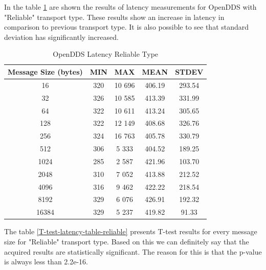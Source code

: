 \documentclass{csfourzero}
\begin{document}
In the table \ref{openDDS-latency-table-reliable} are shown the results of latency measurements for OpenDDS with "Reliable" transport type. These results show an increase in latency in comparison to previous transport type. It is also possible to see that standard deviation has significantly increased.

\begin{table}[!ht]
	\centering
	\caption{OpenDDS Latency Reliable Type}
	\label{openDDS-latency-table-reliable}
	\begin{tabular}{|c|c|c|c|c|}
		\hline 
		Message Size (bytes)& MIN & MAX & MEAN & STDEV \\ 
		\hline 
		16 & 320 & 10 696 & 406.19 & 293.54 \\ 
		\hline 
		32 & 326 & 10 585 & 413.39 & 331.99 \\ 
		\hline 
		64 & 322 & 10 611 & 413.24 & 305.65 \\ 
		\hline 
		128 & 322 & 12 149 & 408.68 & 326.76 \\ 
		\hline 
		256 & 324 & 16 763 & 405.78 & 330.79 \\ 
		\hline 
		512 & 306 & 5 333 & 404.52 & 189.25 \\ 
		\hline 
		1024 & 285 & 2 587 & 421.96 & 103.70 \\ 
		\hline 
		2048 & 310 & 7 052 & 413.88 & 212.52 \\ 
		\hline 
		4096 & 316 & 9 462 & 422.22 & 218.54 \\ 
		\hline 
		8192 & 329 & 6 076 & 426.91 & 192.32 \\ 
		\hline 
		16384 & 329 & 5 237 & 419.82 & 91.33 \\ 
		\hline 
	\end{tabular}
\end{table}

The table \ref{T-test-latency-table-reliable} presents T-test results for every message size for "Reliable" transport type. Based on this we can definitely say that the acquired results are statistically significant. The reason for this is that the p-value is always less than 2.2e-16.
\end{document}
